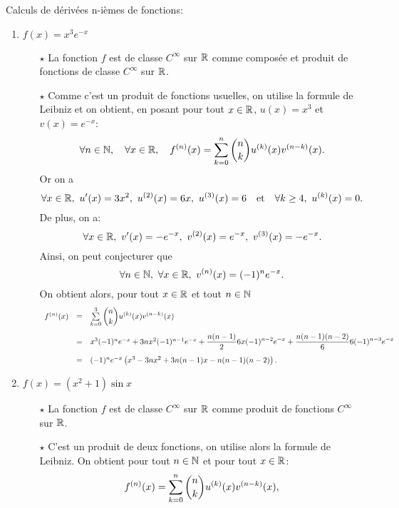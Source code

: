 \documentclass[a4paper, 11pt,reqno]{article}
\begin{document}
\begin{correction}  \;
	Calculs de d\'eriv\'ees n-i\`emes de fonctions:
	\begin{enumerate}
		\item   $f(x)=x^3e^{-x}$
		      \begin{itemize}
			      \item[$\star$] La fonction $f$ est de classe $C^{\infty}$ sur $\mathbb{R}$ comme compos\'ee et produit de fonctions de classe $C^{\infty}$ sur $\mathbb{R}$.
			      \item[$\star$] Comme c'est un produit de fonctions usuelles, on utilise la formule de Leibniz et on obtient, en posant pour tout $x\in\mathbb{R}$, $u(x)=x^3$ et $v(x)=e^{-x}$:
			            $$\forall n\in\mathbb{N},\quad \forall x\in\mathbb{R},\quad f^{(n)}(x)=\sum\limits_{k=0}^n \displaystyle \binom{n}{k} u^{(k)}(x)v^{(n-k)}(x).$$
			            Or on a
			            $$\forall x\in\R,\ u^{\prime}(x)=3x^2,\ u^{(2)}(x)=6x,\ u^{(3)}(x)=6\quad \hbox{et}\quad \forall k\geq 4,\ u^{(k)}(x)=0.$$
			            De plus, on a:
			            $$\forall x\in\R,\ v^{\prime}(x)=-e^{-x},\ v^{(2)}(x)=e^{-x},\ v^{(3)}(x)=-e^{-x}.$$
			            Ainsi, on peut conjecturer que
			            $$\forall n\in\mathbb{N},\ \forall x\in\mathbb{R},\ v^{(n)}(x)=(-1)^ne^{-x}.$$
			            On obtient alors, pour tout $x\in\mathbb{R}$ et tout $n\in\mathbb{N}$
			            $$\begin{array}{lll}
					            f^{(n)}(x) & = & \sum\limits_{k=0}^3 \ddp \binom{n}{k} u^{(k)}(x)v^{(n-k)}(x)\vsec                                                            \\
					                       & = & x^3(-1)^ne^{-x}+3nx^2(-1)^{n-1}e^{-x}+\ddp\frac{n(n-1)}{2}6x(-1)^{n-2}e^{-x}+\ddp\frac{n(n-1)(n-2)}{6}6(-1)^{n-3}e^{-x}\vsec \\
					                       & = & (-1)^ne^{-x}\left( x^3-3nx^2+3n(n-1)x-n(n-1)(n-2)\right).
				            \end{array}$$
		      \end{itemize}
		\item   $f(x)=(x^2+1)\sin{x}$
		      \begin{itemize}
			      \item[$\star$] La fonction $f$ est de classe $C^{\infty}$ sur $\mathbb{R}$ comme produit de fonctions $C^{\infty}$ sur $\mathbb{R}$.
			      \item[$\star$] C'est un produit de deux fonctions, on utilise alors la formule de Leibniz. On obtient pour tout $n \in\mathbb{N}$ et pour tout $x\in\mathbb{R}$:
			            $$f^{(n)}(x)=\sum\limits_{k=0}^n \displaystyle \binom{n}{k} u^{(k)}(x)v^{(n-k)}(x),$$

\end{itemize}
\end{enumerate}
\end{correction}
\end{document}
